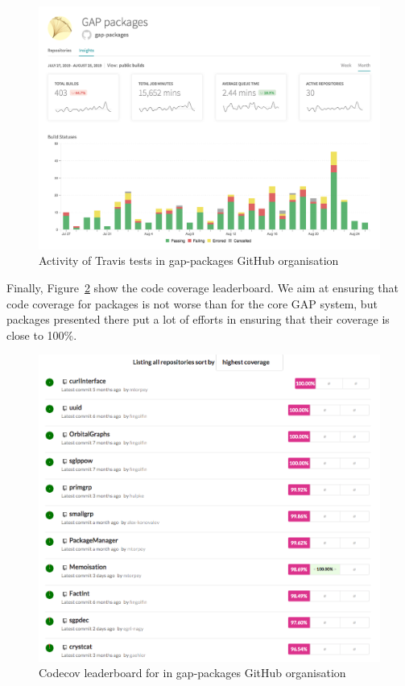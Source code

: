 \documentclass{deliverablereport}
\begin{document}
\begin{figure}[!ht]
    \centering
    \includegraphics[width=\textwidth]{images/gap-packages-travis}
    \caption{Activity of Travis tests in gap-packages GitHub organisation}
    \label{fig:gap-packages-travis}
\end{figure}

Finally, Figure~\ref{fig:gap-packages-codecov} show the code coverage
leaderboard. We aim at ensuring that code coverage for packages is 
not worse than for the core GAP system, but packages presented there 
put a lot of efforts in ensuring that their coverage is close to 100\%. 

\begin{figure}[!ht]
    \centering
    \includegraphics[width=\textwidth]{images/gap-packages-codecov}
    \caption{Codecov leaderboard for in gap-packages GitHub organisation}
    \label{fig:gap-packages-codecov}
\end{figure}
\end{document}
